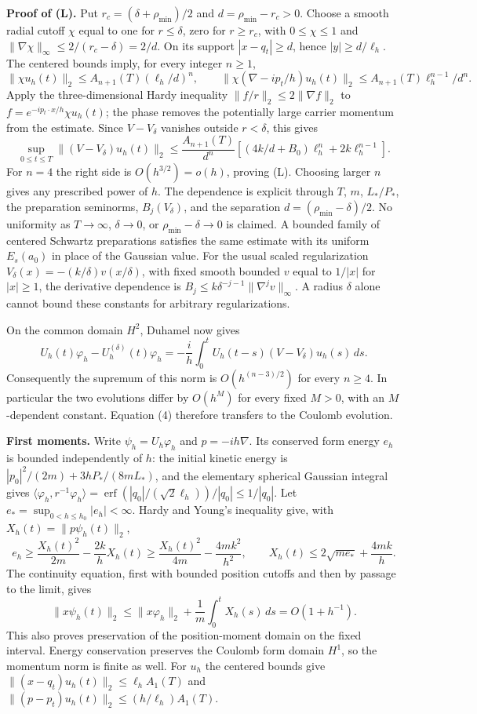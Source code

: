 \documentclass[11pt,a4paper]{article}
\begin{document}
\textbf{Proof of (L).} Put \(r_c=(\delta+\rho_{\min})/2\) and
\(d=\rho_{\min}-r_c>0\). Choose a smooth radial cutoff \(\chi\) equal to
one for \(r\le\delta\), zero for \(r\ge r_c\), with \(0\le\chi\le1\) and
\(\|\nabla\chi\|_\infty\le2/(r_c-\delta)=2/d\). On its support
\(|x-q_t|\ge d\), hence \(|y|\ge d/\ell_h\). The centered bounds imply,
for every integer \(n\ge1\),
\[\|\chi u_h(t)\|_2\le A_{n+1}(T)(\ell_h/d)^n,\qquad
\|\chi(\nabla-ip_t/h)u_h(t)\|_2
\le A_{n+1}(T)\ell_h^{n-1}/d^n.\] Apply the three-dimensional Hardy
inequality \(\|f/r\|_2\le2\|\nabla f\|_2\) to
\(f=e^{-ip_t\cdot x/h}\chi u_h(t)\); the phase removes the potentially
large carrier momentum from the estimate. Since \(V-V_\delta\) vanishes
outside \(r<\delta\), this gives
\[\sup_{0\le t\le T}\|(V-V_\delta)u_h(t)\|_2
\le\frac{A_{n+1}(T)}{d^n}
\left[(4k/d+B_0)\ell_h^n+2k\ell_h^{n-1}\right].\tag{4b}\] For \(n=4\)
the right side is \(O(h^{3/2})=o(h)\), proving (L). Choosing larger
\(n\) gives any prescribed power of \(h\). The dependence is explicit
through \(T\), \(m\), \(L_*/P_*\), the preparation seminorms,
\(B_j(V_\delta)\), and the separation \(d=(\rho_{\min}-\delta)/2\). No
uniformity as \(T\to\infty\), \(\delta\to0\), or
\(\rho_{\min}-\delta\to0\) is claimed. A bounded family of centered
Schwartz preparations satisfies the same estimate with its uniform
\(E_s(a_0)\) in place of the Gaussian value. For the usual scaled
regularization \(V_\delta(x)=-(k/\delta)v(x/\delta)\), with fixed smooth
bounded \(v\) equal to \(1/|x|\) for \(|x|\ge1\), the derivative
dependence is \(B_j\le k\delta^{-j-1}\|\nabla^jv\|_\infty\). A radius
\(\delta\) alone cannot bound these constants for arbitrary
regularizations.

On the common domain \(H^2\), Duhamel now gives
\[U_h(t)\varphi_h-U_h^{(\delta)}(t)\varphi_h
=-\frac ih\int_0^tU_h(t-s)(V-V_\delta)u_h(s)\,ds.\] Consequently the
supremum of this norm is \(O(h^{(n-3)/2})\) for every \(n\ge4\). In
particular the two evolutions differ by \(O(h^M)\) for every fixed
\(M>0\), with an \(M\)-dependent constant. Equation (4) therefore
transfers to the Coulomb evolution.

\textbf{First moments.} Write \(\psi_h=U_h\varphi_h\) and
\(p=-ih\nabla\). Its conserved form energy \(e_h\) is bounded
independently of \(h\): the initial kinetic energy is
\(|p_0|^2/(2m)+3hP_*/(8mL_*)\), and the elementary spherical Gaussian
integral gives \(\langle\varphi_h,r^{-1}\varphi_h\rangle
=\operatorname{erf}(|q_0|/(\sqrt2\ell_h))/|q_0|\le1/|q_0|\). Let
\(e_*=\sup_{0<h\le h_0}|e_h|<\infty\). Hardy and Young's inequality
give, with \(X_h(t)=\|p\psi_h(t)\|_2\),
\[e_h\ge\frac{X_h(t)^2}{2m}-\frac{2k}{h}X_h(t)
\ge\frac{X_h(t)^2}{4m}-\frac{4mk^2}{h^2},\qquad
X_h(t)\le2\sqrt{m e_*}+\frac{4mk}{h}.\tag{4c}\] The continuity equation,
first with bounded position cutoffs and then by passage to the limit,
gives \[\|x\psi_h(t)\|_2
\le\|x\varphi_h\|_2+\frac1m\int_0^tX_h(s)\,ds=O(1+h^{-1}).\tag{4d}\]
This also proves preservation of the position-moment domain on the fixed
interval. Energy conservation preserves the Coulomb form domain \(H^1\),
so the momentum norm is finite as well. For \(u_h\) the centered bounds
give \(\|(x-q_t)u_h(t)\|_2\le\ell_h A_1(T)\) and
\(\|(p-p_t)u_h(t)\|_2\le(h/\ell_h)A_1(T)\).
\end{document}
